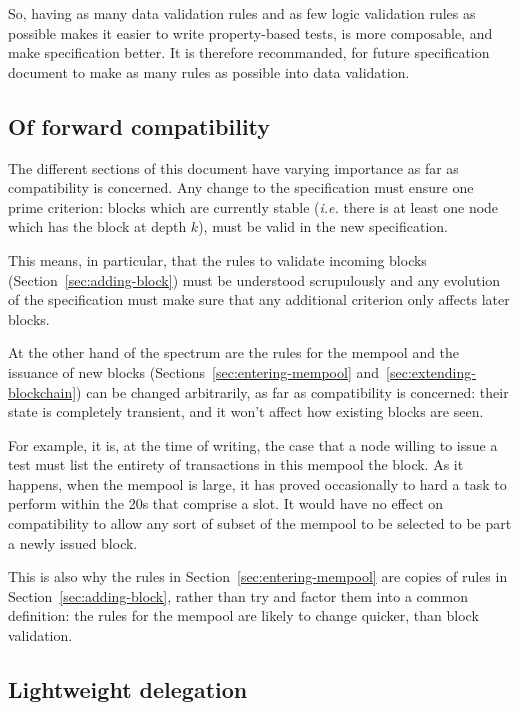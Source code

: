 \documentclass{article}
\begin{document}
So, having as many data validation rules and as few logic validation
rules as possible makes it easier to write property-based tests, is
more composable, and make specification better. It is therefore
recommanded, for future specification document to make as many rules
as possible into data validation.

\subsection{Of forward compatibility}
\label{sec:forward-comp}

The different sections of this document have varying importance as far
as compatibility is concerned. Any change to the specification must
ensure one prime criterion: blocks which are currently stable
(\emph{i.e.} there is at least one node which has the block at depth
$k$), must be valid in the new specification.

This means, in particular, that the rules to validate incoming blocks
(Section~\ref{sec:adding-block}) must be understood scrupulously and
any evolution of the specification must make sure that any additional
criterion only affects later blocks.

At the other hand of the spectrum are the rules for the mempool and
the issuance of new blocks (Sections~\ref{sec:entering-mempool}
and~\ref{sec:extending-blockchain}) can be changed arbitrarily, as far
as compatibility is concerned: their state is completely transient,
and it won't affect how existing blocks are seen.

For example, it is, at the time of writing, the case that a node
willing to issue a test must list the entirety of transactions in this
mempool the block. As it happens, when the mempool is large, it has
proved occasionally to hard a task to perform within the 20s that
comprise a slot. It would have no effect on compatibility to allow any
sort of subset of the mempool to be selected to be part a newly issued
block.

This is also why the rules in Section~\ref{sec:entering-mempool} are
copies of rules in Section~\ref{sec:adding-block}, rather than try and
factor them into a common definition: the rules for the mempool are
likely to change quicker, than block validation.

\subsection{Lightweight delegation}
\label{sec:lightweight-delegation}
\end{document}
